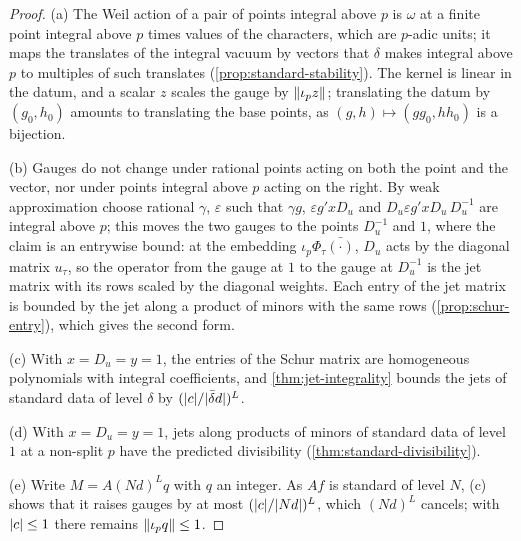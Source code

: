 \begin{proof}
(a) The Weil action of a pair of points integral above $p$ is $\omega$ at a finite point integral above $p$ times values of the characters, which are $p$-adic units; it maps the translates of the integral vacuum by vectors that $\delta$ makes integral above $p$ to multiples of such translates (\cref{prop:standard-stability}). The kernel is linear
in the datum, and a scalar $z$ scales the gauge by $\lVert \iota_pz\rVert$; translating the datum by $(g_0,h_0)$ amounts to translating the base points, as $(g,h)\mapsto(gg_0,hh_0)$ is a bijection.

(b) Gauges do not change under rational points acting on both the point and the vector, nor under points integral above $p$ acting on the right. By weak approximation choose rational $\gamma$, $\varepsilon$ such that $\gamma g$, $\varepsilon g'xD_u$ and $D_u\varepsilon g'xD_u\,D_u^{-1}$ are integral above $p$; this moves the two gauges to the points $D_u^{-1}$ and
$1$, where the claim is an entrywise bound: at the embedding $\iota_p\Phi_\tau\bar{(\cdot)}$, $D_u$ acts by the diagonal matrix $u_\tau$, so the operator from the gauge at $1$ to the gauge at $D_u^{-1}$ is the jet matrix with its rows scaled by the diagonal weights. Each entry of the jet matrix is bounded by the jet along a product of minors with the
same rows (\cref{prop:schur-entry}), which gives the second form.

(c) With $x=D_u=y=1$, the entries of the Schur matrix are homogeneous polynomials with integral coefficients, and \cref{thm:jet-integrality} bounds the jets of standard data of level $\delta$ by $(\lvert c\rvert/\lvert \bar\delta d\rvert)^L$.

(d) With $x=D_u=y=1$, jets along products of minors of standard data of level $1$ at a non-split $p$ have the predicted divisibility (\cref{thm:standard-divisibility}).

(e) Write $M=A(Nd)^Lq$ with $q$ an integer. As $Af$ is standard of level $N$, (c) shows that it raises gauges by at most $(\lvert c\rvert/\lvert Nd\rvert)^L$, which $(Nd)^L$ cancels; with $\lvert c\rvert\le1$ there remains $\lVert \iota_pq\rVert\le1$.
\end{proof}

